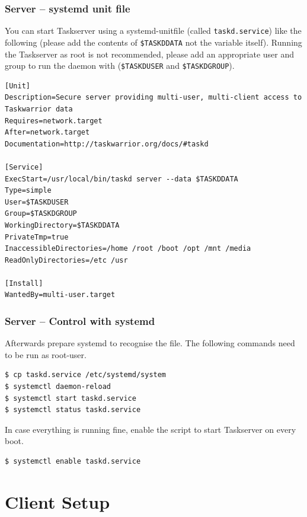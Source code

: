\documentclass[t,handout]{beamer}
\begin{document}
\begin{frame}[fragile]\frametitle{Server -- systemd unit file}
    \vfill
    You can start Taskserver using a systemd-unitfile (called \verb=taskd.service=) like the following (please add the contents of \verb+$TASKDDATA+ not the variable itself). Running the Taskserver as root is not recommended, please add an appropriate user and group to run the daemon with (\verb+$TASKDUSER+ and \verb+$TASKDGROUP+).

    \begin{lstlisting}
[Unit]
Description=Secure server providing multi-user, multi-client access to Taskwarrior data
Requires=network.target
After=network.target
Documentation=http://taskwarrior.org/docs/#taskd

[Service]
ExecStart=/usr/local/bin/taskd server --data $TASKDDATA
Type=simple
User=$TASKDUSER
Group=$TASKDGROUP
WorkingDirectory=$TASKDDATA
PrivateTmp=true
InaccessibleDirectories=/home /root /boot /opt /mnt /media
ReadOnlyDirectories=/etc /usr

[Install]
WantedBy=multi-user.target\end{lstlisting}
\end{frame}

\begin{frame}[fragile]\frametitle{Server -- Control with systemd}
    \vfill
    Afterwards prepare systemd to recognise the file. The following commands need to be run as root-user.

    \begin{lstlisting}
$ cp taskd.service /etc/systemd/system
$ systemctl daemon-reload
$ systemctl start taskd.service
$ systemctl status taskd.service\end{lstlisting}

    In case everything is running fine, enable the script to start Taskserver on every boot.

    \begin{lstlisting}
$ systemctl enable taskd.service\end{lstlisting}
\end{frame}

\section{Client Setup}
\end{document}
